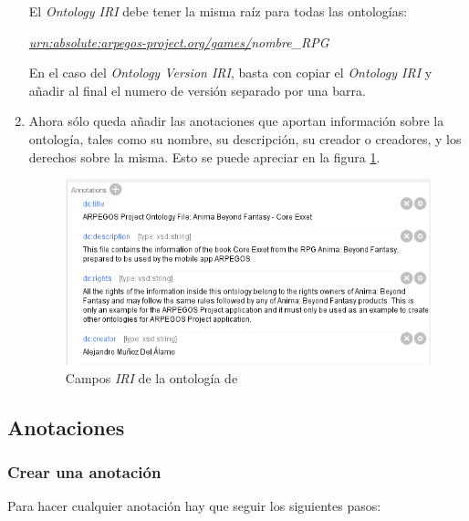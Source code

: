 \begin{enumerate}
    \newpage
    El \textit{Ontology IRI} debe tener la misma raíz para todas las ontologías:

    \textit{\underline{urn:absolute:arpegos-project.org/games/}nombre\_RPG} \medskip

    En el caso del \textit{Ontology Version IRI}, basta con copiar el \textit{Ontology IRI} y añadir al final el numero de versión 
    separado por una barra.\medskip

    \item Ahora sólo queda añadir las anotaciones que aportan información sobre la ontología, tales como su nombre, su descripción, su
    creador o creadores, y los derechos sobre la misma. Esto se puede apreciar en la figura \ref*{anima_annotations}.

    \begin{figure}[ht]
        \centering
        \includegraphics[scale=0.6]{Figures/Protege/anima_annotations.png}
        \caption{Campos \textit{IRI} de la ontología de \anima}
        \label{anima_annotations}
    \end{figure}
\end{enumerate}

\subsection{Anotaciones}
\subsubsection{Crear una anotación}
Para hacer cualquier anotación hay que seguir los siguientes pasos:

